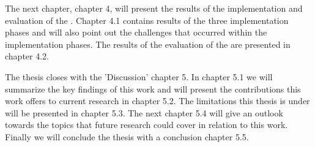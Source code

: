 The next chapter, chapter 4, will present the results of the implementation and evaluation of the \aiprat.
Chapter 4.1 contains results of the three implementation phases and will also point out the challenges that occurred within the implementation phases.
The results of the evaluation of the \aiprat are presented in chapter 4.2.

The thesis closes with the 'Discussion' chapter 5. 
In chapter 5.1 we will summarize the key findings of this work and will present the contributions this work offers to current research in chapter 5.2.
The limitations this thesis is under will be presented in chapter 5.3.
The next chapter 5.4 will give an outlook towards the topics that future research could cover in relation to this work.
Finally we will conclude the thesis with a conclusion chapter 5.5.

